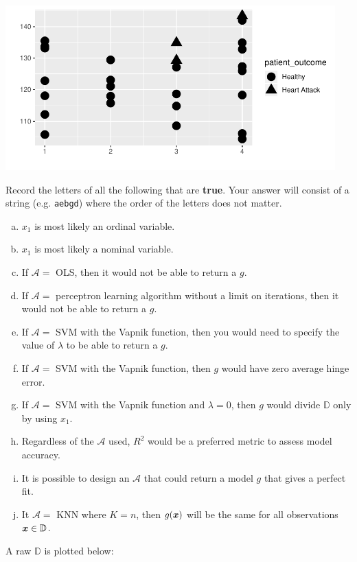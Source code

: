 \documentclass[12pt]{article}
\begin{document}
\beqn
\centering\includegraphics[width=5in]{nonlinsep.pdf}
\eeqn

\benum

 Record the letters of all the following that are \textbf{true}. Your answer will consist of a string (e.g. \texttt{aebgd}) where the order of the letters does not matter.

\begin{enumerate}[(a)]
\item $x_1$ is most likely an ordinal variable.
\item $x_1$ is most likely a nominal variable.
\item If $\mathcal{A} =$ OLS, then it would not be able to return a $g$.
\item If $\mathcal{A} =$ perceptron learning algorithm without a limit on iterations, then it would not be able to return a $g$.
\item If $\mathcal{A} =$ SVM with the Vapnik function, then you would need to specify the value of $\lambda$ to be able to return a $g$.
\item If $\mathcal{A} =$ SVM with the Vapnik function, then $g$ would have zero average hinge error.
\item If $\mathcal{A} =$ SVM with the Vapnik function and $\lambda = 0$, then $g$ would divide $\mathbb{D}$ only by using $x_1$.
\item Regardless of the $\mathcal{A}$ used, $R^2$ would be a preferred metric to assess model accuracy.
\item It is possible to design an $\mathcal{A}$ that could return a model $g$ that gives a perfect fit.
\item It $\mathcal{A} =$ KNN where $K = n$, then $g(\boldsymbol{x})$ will be the same for all observations $\boldsymbol{x} \in \mathbb{D}$.
\end{enumerate}
\eenum\pagebreak

\problem [15min] A raw $\mathbb{D}$ is plotted below:
\end{document}
